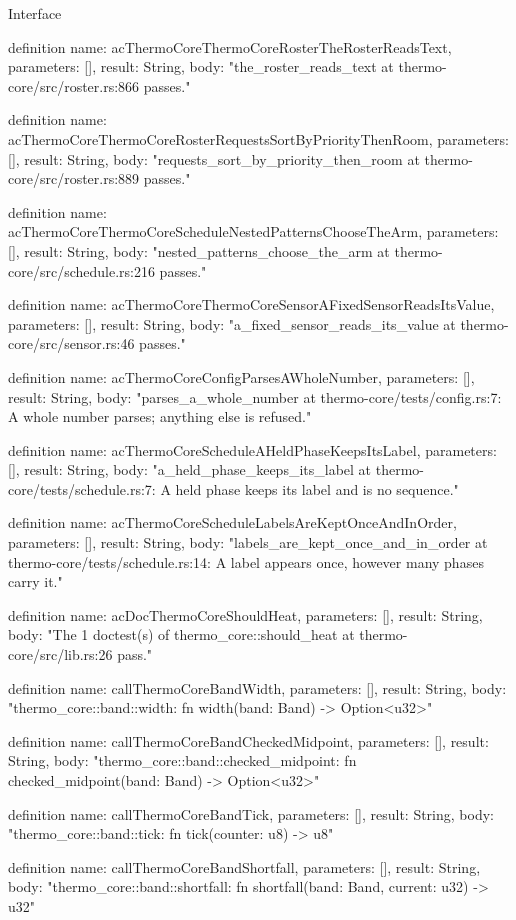\begin{lexlean}{Interface}
\begin{semanticmodule}
definition{
  name: acThermoCoreThermoCoreRosterTheRosterReadsText,
  parameters: [],
  result: String,
  body: "the_roster_reads_text at thermo-core/src/roster.rs:866 passes."
}

definition{
  name: acThermoCoreThermoCoreRosterRequestsSortByPriorityThenRoom,
  parameters: [],
  result: String,
  body: "requests_sort_by_priority_then_room at thermo-core/src/roster.rs:889 passes."
}

definition{
  name: acThermoCoreThermoCoreScheduleNestedPatternsChooseTheArm,
  parameters: [],
  result: String,
  body: "nested_patterns_choose_the_arm at thermo-core/src/schedule.rs:216 passes."
}

definition{
  name: acThermoCoreThermoCoreSensorAFixedSensorReadsItsValue,
  parameters: [],
  result: String,
  body: "a_fixed_sensor_reads_its_value at thermo-core/src/sensor.rs:46 passes."
}

definition{
  name: acThermoCoreConfigParsesAWholeNumber,
  parameters: [],
  result: String,
  body: "parses_a_whole_number at thermo-core/tests/config.rs:7: A whole number parses; anything else is refused."
}

definition{
  name: acThermoCoreScheduleAHeldPhaseKeepsItsLabel,
  parameters: [],
  result: String,
  body: "a_held_phase_keeps_its_label at thermo-core/tests/schedule.rs:7: A held phase keeps its label and is no sequence."
}

definition{
  name: acThermoCoreScheduleLabelsAreKeptOnceAndInOrder,
  parameters: [],
  result: String,
  body: "labels_are_kept_once_and_in_order at thermo-core/tests/schedule.rs:14: A label appears once, however many phases carry it."
}

definition{
  name: acDocThermoCoreShouldHeat,
  parameters: [],
  result: String,
  body: "The 1 doctest(s) of thermo_core::should_heat at thermo-core/src/lib.rs:26 pass."
}

definition{
  name: callThermoCoreBandWidth,
  parameters: [],
  result: String,
  body: "thermo_core::band::width: fn width(band: Band) -> Option<u32>"
}

definition{
  name: callThermoCoreBandCheckedMidpoint,
  parameters: [],
  result: String,
  body: "thermo_core::band::checked_midpoint: fn checked_midpoint(band: Band) -> Option<u32>"
}

definition{
  name: callThermoCoreBandTick,
  parameters: [],
  result: String,
  body: "thermo_core::band::tick: fn tick(counter: u8) -> u8"
}

definition{
  name: callThermoCoreBandShortfall,
  parameters: [],
  result: String,
  body: "thermo_core::band::shortfall: fn shortfall(band: Band, current: u32) -> u32"
}


\end{semanticmodule}
\end{lexlean}
